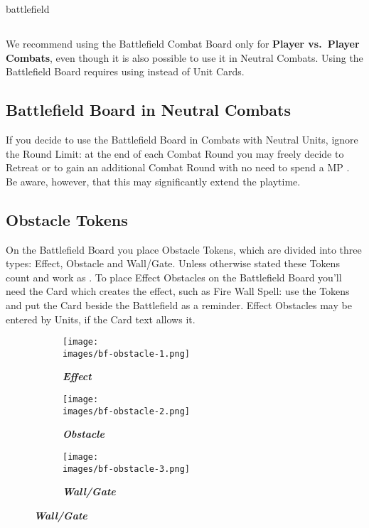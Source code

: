 \pagebreak
\begin{expansion}{battlefield}
  \begin{multicols*}{2}
  \subsection*{}
  We recommend using the Battlefield Combat Board only for \textbf{Player vs.~Player Combats}, even though it is also possible to use it in Neutral Combats.
  Using the Battlefield Board requires using  instead of Unit Cards.

  \medskip
  \subsection*{Battlefield Board in Neutral Combats}
  If you decide to use the Battlefield Board in Combats with Neutral Units, ignore the Round Limit:
  at the end of each Combat Round you may freely decide to Retreat or to gain an additional Combat Round with no need to spend a MP .
  Be aware, however, that this may significantly extend the playtime.

  \medskip
  \subsection*{Obstacle Tokens}
  On the Battlefield Board you place Obstacle Tokens, which are divided into three types:
  Effect, Obstacle and Wall/Gate.
  Unless otherwise stated these Tokens count and work as .
  To place Effect Obstacles on the Battlefield Board you'll need the Card which creates the effect, such as Fire Wall Spell: use the Tokens and put the Card beside the Battlefield as a reminder.
  Effect Obstacles may be entered by Units, if the Card text allows it.
  \vspace*{1em}
  \begin{figure}[H]
    \centering
    \begin{subfigure}[b]{0.3\linewidth}
      \centering
      \texttt{[image: \\images/bf-obstacle-1.png]}
      \caption{\textbf{\textit{\textcolor{darkcandyapplered}{Effect}}}}
    \end{subfigure}
    \begin{subfigure}[b]{0.3\linewidth}
      \centering
      \texttt{[image: \\images/bf-obstacle-2.png]}
      \caption{\textbf{\textit{\textcolor{darkcandyapplered}{Obstacle}}}}
    \end{subfigure}
    \begin{subfigure}[b]{0.3\linewidth}
      \centering
      \texttt{[image: \\images/bf-obstacle-3.png]}
      \caption{\textbf{\textit{\textcolor{darkcandyapplered}{Wall/Gate}}}}
    \end{subfigure}
  \end{figure}
  \vspace*{1em}
  \columnbreak


\end{multicols*}
\end{expansion}

